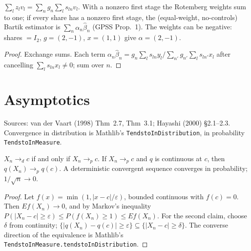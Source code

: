 \begin{theorem}
\label{thm:rotemberg}
\leanok
{}
$\sum_lz_lv_l = \sum_ng_n\sum_ls_{ln}v_l$. With a nonzero first stage the Rotemberg weights sum to one; if every share
has a nonzero first stage, the (equal-weight, no-controls) Bartik estimator is $\sum_n\alpha_n\hat\beta_n$ (GPSS
Prop.~1). The weights can be negative: shares $=I_2$, $g = (2,-1)$, $x = (1,1)$ give $\alpha = (2,-1)$.
\end{theorem}
\begin{proof}
\leanok
Exchange sums. Each term $\alpha_n\hat\beta_n = g_n\sum_ls_{ln}y_l/\sum_{n'}g_{n'}\sum_ls_{ln'}x_l$ after cancelling
$\sum_ls_{ln}x_l\ne0$; sum over $n$.
\end{proof}

\section{Asymptotics}
\label{sec:asymptotics}

Sources: van der Vaart (1998) Thm~2.7, Thm~3.1; Hayashi (2000) \S2.1--2.3. Convergence in distribution is Mathlib's
\texttt{TendstoInDistribution}, in probability \texttt{TendstoInMeasure}.

\begin{lemma}
\label{lem:conv-const}
\leanok
$X_n\to_dc$ if and only if $X_n\to_pc$. If $X_n\to_pc$ and $q$ is continuous at $c$, then $q(X_n)\to_pq(c)$. A deterministic
convergent sequence converges in probability; $1/\sqrt n\to0$.
\end{lemma}
\begin{proof}
\leanok
Let $f(x) = \min(1,|x-c|/\varepsilon)$, bounded continuous with $f(c) = 0$. Then $E f(X_n)\to0$, and by Markov's
inequality $P(|X_n - c|\ge\varepsilon)\le P(f(X_n)\ge1)\le Ef(X_n)$. For the second claim, choose $\delta$ from
continuity; $\{|q(X_n)-q(c)|\ge\varepsilon\}\subseteq\{|X_n-c|\ge\delta\}$. The converse direction of the
equivalence is Mathlib's \texttt{TendstoInMeasure.tendstoInDistribution}.
\end{proof}

